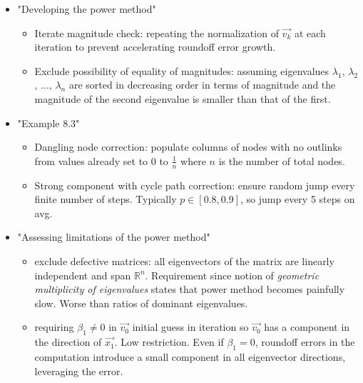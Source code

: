 \documentclass[unicode,11pt,a4paper,oneside,numbers=endperiod,openany]{scrartcl}
\begin{document}
\begin{enumerate}
\begin{itemize}
            \item "Developing the power method"
                  \begin{itemize}
                      \item
                            Iterate magnitude check: repeating the normalization of $\vec{v_k}$ at each iteration to prevent accelerating roundoff error growth.

                      \item
                            Exclude possibility of equality of magnitudes: assuming eigenvalues $\lambda_1$, $\lambda_2$, ..., $\lambda_n$ are sorted in decreasing
                            order in terms of magnitude and the magnitude of the second eigenvalue is smaller than that of the first.
                  \end{itemize}

            \item "Example 8.3"
                  \begin{itemize}
                      \item
                            Dangling node correction: populate columns of nodes with no outlinks from values
                            already set to 0 to $\frac{1}{n}$ where $n$ is the number of total nodes.

                      \item
                            Strong component with cycle path correction: ensure random jump every finite number of steps.
                            Typically $p \in [0.8, 0.9]$, so jump every 5 steps on avg.
                  \end{itemize}

            \item "Assessing limitations of the power method"
                  \begin{itemize}
                      \item
                            exclude defective matrices: all eigenvectors of the matrix are linearly independent and span $\mathbb{R}^n$.
                            Requirement since notion of \textit{geometric multiplicity of eigenvalues} states
                            that power method becomes painfully slow.
                            Worse than ratios of dominant eigenvalues.

                      \item
                            requiring $\beta_1 \neq 0$ in  $\vec{v_0}$ initial guess in iteration so $\vec{v_0}$ has a component in the direction of $\vec{x_1}$. Low restriction.
                            Even if $\beta_1 = 0$, roundoff errors in the computation introduce a small component in all eigenvector directions, leveraging the error.


\end{itemize}
\end{itemize}
\end{enumerate}
\end{document}
